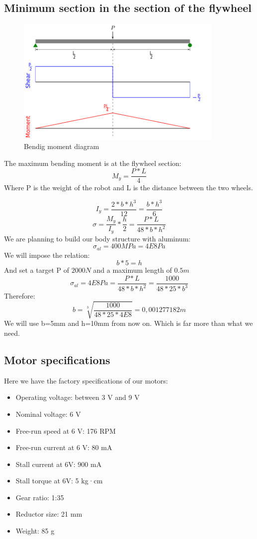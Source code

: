 \subsection{Minimum section in the section of the flywheel}
\begin{figure}[ht]
	\centering
	\includegraphics[width=10cm]{img/Shear_Moment_Diagram.png}
	\caption{Bendig moment diagram}
	\label{fig:Bendig moment diagram}
\end{figure}
The maximum bending moment is at the flywheel section:
\[M_y = \frac{P * L}{4}\]
Where P is the weight of the robot and L is the distance between the two wheels.



\[I_y = \frac{2*b*h^3}{12}=\frac{b*h^3}{6}\]
\[\sigma=\frac{M_y}{I_y}*\frac{h}{2} = \frac{P*L}{48*b*h^2}\]
We are planning to build our body structure with aluminum:
\[\sigma_{al} = 400MPa = 4E8Pa\]
We will impose the relation:
\[b * 5 = h\]
And set a target P of $2000N$ and a maximum length of $0.5m$
\[\sigma_{al} = 4E8Pa = \frac{P*L}{48*b*h^2} = \frac{1000}{48*25*b^3} \]
Therefore:
\[b = \sqrt[3]{\frac{1000}{48*25*4E8}} = 0,001277182 m\]
We will use b=5mm and h=10mm from now on. Which is far more than what we need.

\subsection{Motor specifications}
Here we have the factory specifications of our motors: 
\begin{itemize}
    \item Operating voltage: between 3 V and 9 V
    \item Nominal voltage: 6 V
    \item Free-run speed at 6 V: 176 RPM
    \item Free-run current at 6 V: 80 mA
    \item Stall current at 6V: 900 mA
    \item Stall torque at 6V: 5 kg·cm
    \item Gear ratio: 1:35
    \item Reductor size: 21 mm
    \item Weight: 85 g
\end{itemize}
